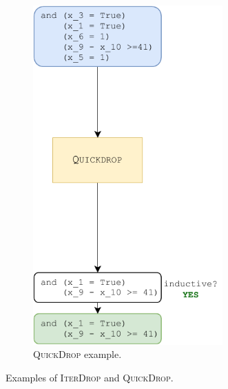 \begin{figure}[t]
\begin{subfigure}[b]{0.45\textwidth}
        \includegraphics[width=0.8\textwidth]{figures/doping-spc_qd.pdf}
        \caption{\textsc{QuickDrop} example.}
    	\label{fig:spc_q_ind_gen}
	\end{subfigure}
	\caption{Examples of \textsc{IterDrop} and \textsc{QuickDrop}.}
    \label{fig:my_label}
\end{figure}

